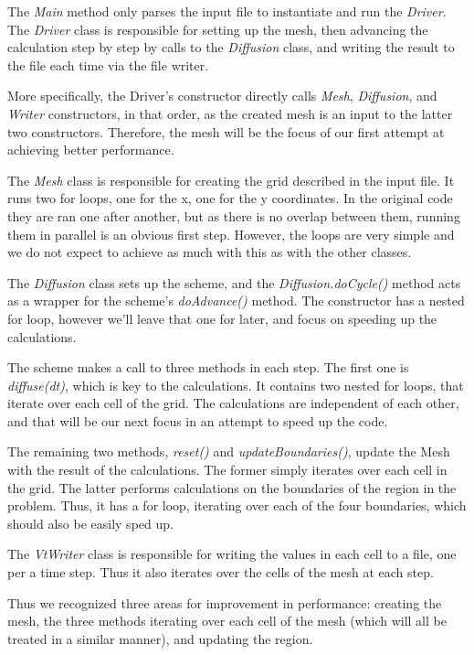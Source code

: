 \documentclass[11pt,journal]{IEEEtran}
\begin{document}
	The \emph{Main} method only parses the input file to instantiate and run the \emph{Driver}. The \emph{Driver} class is responsible for setting up the mesh, then advancing the calculation step by step by calls to the \emph{Diffusion} class, and writing the result to the file each time via the file writer. 
	
	More specifically, the Driver's constructor directly calls \emph{Mesh}, \emph{Diffusion}, and \emph{Writer} constructors, in that order, as the created mesh is an input to the latter two constructors. Therefore, the mesh will be the focus of our first attempt at achieving better performance. 
	
	The \emph{Mesh} class is responsible for creating the grid described in the input file. It runs two for loops, one for the x, one for the y coordinates. In the original code they are ran one after another, but as there is no overlap between them, running them in parallel is an obvious first step. However, the loops are very simple and we do not expect to achieve as much with this as with the other classes.
	
	The \emph{Diffusion} class sets up the scheme, and the \emph{Diffusion.doCycle()} method acts as a wrapper for the scheme's \emph{doAdvance()} method. The constructor has a nested for loop, however we'll leave that one for later, and focus on speeding up the calculations.
	
	The scheme makes a call to three methods in each step. The first one is \emph{diffuse(dt)}, which is key to the calculations. It contains two nested for loops, that iterate over each cell of the grid. The calculations are independent of each other, and that will be our next focus in an attempt to speed up the code.
	
	The remaining two methods, \emph{reset()} and \emph{updateBoundaries()}, update the Mesh with the result of the calculations. The former simply iterates over each cell in the grid. The latter performs calculations on the boundaries of the region in the problem. Thus, it has a for loop, iterating over each of the four boundaries, which should also be easily sped up.
	
	The \emph{VtWriter} class is responsible for writing the values in each cell to a file, one per a time step. Thus it also iterates over the cells of the mesh at each step.
	
	Thus we recognized three areas for improvement in performance: creating the mesh, the three methods iterating over each cell of the mesh (which will all be treated in a similar manner), and updating the region. 
	
\end{document}
